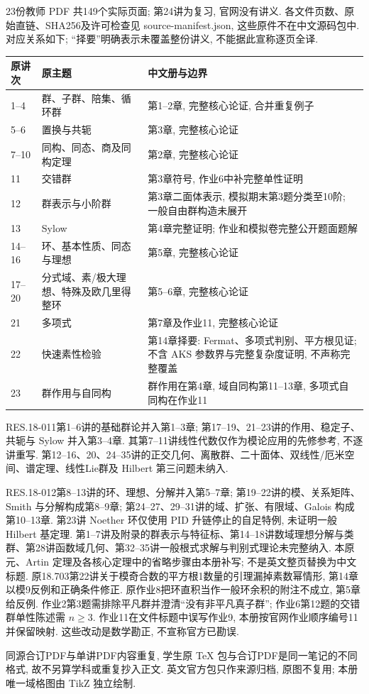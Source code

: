 23份教师 PDF 共149个实际页面; 第24讲为复习, 官网没有讲义. 各文件页数、原始直链、SHA256及许可检查见 source-manifest.json, 这些原件不在中文源码包中. 对应关系如下; “择要”明确表示未覆盖整份讲义, 不能据此宣称逐页全译.
\begin{longtable}{@{}p{}p{}p{}@{}}
\toprule 原讲次&原主题&中文册与边界\\\midrule\endhead
1--4&群、子群、陪集、循环群&第1--2章, 完整核心论证, 合并重复例子\\
5--6&置换与共轭&第3章, 完整核心论证\\
7--10&同构、同态、商及同构定理&第2章, 完整核心论证\\
11&交错群&第3章符号, 作业6中补完整单性证明\\
12&群表示与小阶群&第3章二面体表示, 模拟期末第3题分类至10阶; 一般自由群构造未展开\\
13&Sylow&第4章完整证明; 作业和模拟卷完整公开题面题解\\
14--16&环、基本性质、同态与理想&第5章, 完整核心论证\\
17--20&分式域、素/极大理想、特殊及欧几里得整环&第5--6章, 完整核心论证\\
21&多项式&第7章及作业11, 完整核心论证\\
22&快速素性检验&第14章择要: Fermat、多项式判别、平方根见证; 不含 AKS 参数界与完整复杂度证明, 不声称完整覆盖\\
23&群作用与自同构&群作用在第4章, 域自同构第11--13章, 多项式自同构在作业11\\
\bottomrule
\end{longtable}
RES.18-011第1--6讲的基础群论并入第1--3章; 第17--19、21--23讲的作用、稳定子、共轭与 Sylow 并入第3--4章. 其第7--11讲线性代数仅作为模论应用的先修参考, 不逐讲重写. 第12--16、20、24--35讲的正交几何、离散群、二十面体、双线性/厄米空间、谱定理、线性Lie群及 Hilbert 第三问题未纳入.

RES.18-012第8--13讲的环、理想、分解并入第5--7章; 第19--22讲的模、关系矩阵、Smith 与分解构成第8--9章; 第24--27、29--31讲的域、扩张、有限域、Galois 构成第10--13章. 第23讲 Noether 环仅使用 PID 升链停止的自足特例, 未证明一般 Hilbert 基定理. 第1--7讲及附录的群表示与特征标、第14--18讲数域理想分解与类群、第28讲函数域几何、第32--35讲一般根式求解与判别式理论未完整纳入. 本原元、Artin 定理及各核心定理中的省略步骤由本册补写; 不是英文整页替换为中文标题.
原18.703第22讲关于模奇合数的平方根1数量的引理漏掉素数幂情形, 第14章以模9反例和正确条件修正. 原作业8把环直积当作一般环余积的附注不成立, 第5章给反例. 作业2第3题需排除平凡群并澄清“没有非平凡真子群”; 作业6第12题的交错群单性陈述需 $n\ge3$. 作业11在文件标题中误写作业9, 本册按官网作业顺序编号11并保留映射. 这些改动是数学勘正, 不宣称官方已勘误.

同源合订PDF与单讲PDF内容重复, 学生原 TeX 包与合订PDF是同一笔记的不同格式, 故不另算学科或重复抄入正文. 英文官方包只作来源归档, 原图不复用; 本册唯一域格图由 TikZ 独立绘制.
